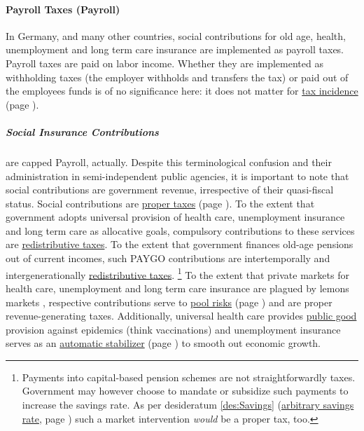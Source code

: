 \paragraph{Payroll Taxes (Payroll)}
	\label{sec:Payroll}
In Germany, and many other countries, social contributions for old age, health, unemployment and long term care insurance are implemented as payroll taxes.
Payroll taxes are paid on labor income.
Whether they are implemented as withholding taxes (the employer withholds and transfers the tax) or paid out of the employees funds is of no significance here:
it does not matter for \hyperref[sec:TaxIncidence]{tax incidence} (page \pageref{sec:TaxIncidence}).

\subparagraph{Social Insurance Contributions}
	\label{sec:SIC}
are capped  \gls{Payroll}, actually.
Despite this terminological confusion and their administration in semi-independent public agencies, it is important to note that social contributions are government revenue, irrespective of their quasi-fiscal status.
Social contributions are \hyperref[sec:PurposesOfTaxation]{proper taxes} (page \pageref{sec:PurposesOfTaxation}).
To the extent that government adopts universal provision of health care, unemployment insurance and long term care as allocative goals, compulsory contributions to these services are \hyperref[sec:Redistribution]{redistributive taxes}.
To the extent that government finances old-age pensions out of current incomes, such PAYGO contributions are intertemporally and intergenerationally \hyperref[sec:Redistribution]{redistributive taxes}.
\footnote{
	Payments into capital-based pension schemes are not straightforwardly taxes.
	Government may however choose to mandate or subsidize such payments to increase the savings rate.
	As per desideratum \ref{des:Savings} (\hyperref[des:Savings]{arbitrary savings rate}, page \pageref{des:Savings}) such a market intervention \emph{would} be a proper tax, too.
}
To the extent that private markets for health care, unemployment and long term care insurance are plagued by lemons markets \citep{Akerlof-1970-aa}, respective contributions serve to \hyperref[sec:RiskPooling]{pool risks} (page \pageref{sec:RiskPooling}) and are proper revenue-generating taxes.
Additionally, universal health care provides \hyperref[sec:PublicGood]{public good} provision against epidemics (think vaccinations) and unemployment insurance serves as an \hyperref[des:AutomaticStabilizer]{automatic stabilizer} (page \pageref{des:AutomaticStabilizer}) to smooth out economic growth.

